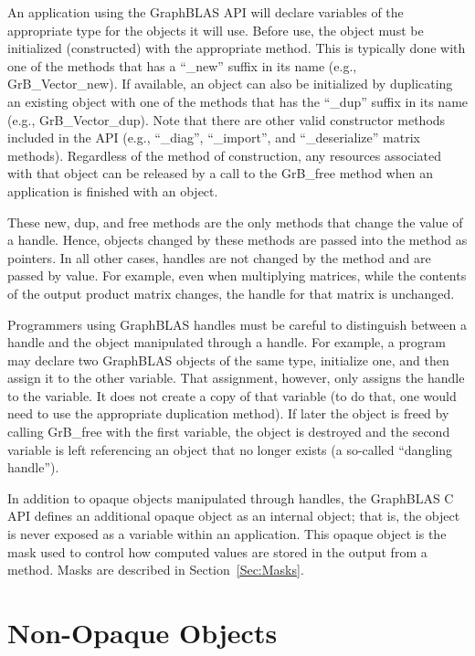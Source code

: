 An application using the GraphBLAS API will declare variables of the appropriate
type for the objects it will use.  Before use, the object must be initialized (constructed) with 
the appropriate method.  This is typically done with one of the methods that has a ``{\sf \_new}'' suffix in its 
name (e.g., {\sf GrB\_Vector\_new}).  If available, an object can also be initialized by duplicating
an existing object with one of the methods that has the ``{\sf \_dup}'' suffix in its 
name  (e.g., {\sf GrB\_Vector\_dup}).  Note that there are other valid constructor methods included in 
the API (e.g., ``{\sf \_diag}'', ``{\sf \_import}'', and ``{\sf \_deserialize}'' matrix methods).
Regardless of the method of construction, any resources associated with that object can be released by a
call to the {\sf GrB\_free} method when an application is finished with 
an object.    

These {\sf new}, {\sf dup}, and {\sf free} methods are the only methods that 
change the value of a handle.  Hence, objects changed by these methods are passed
into the method as pointers.  In all other cases, handles are not changed by the 
method and are passed by value.  For example, even when multiplying matrices, 
while the contents of the output product matrix changes, the handle for that matrix is unchanged. 

Programmers using GraphBLAS handles must be careful to distinguish between a handle and the 
object manipulated through a handle.  For example, a program may declare two 
GraphBLAS objects of the same type, initialize one, and then assign it to the other
variable.  That assignment, however, only assigns the handle to the variable.  It does not 
create a copy of that variable (to do that, one would need to use the appropriate duplication method).
If later the object is freed by calling {\sf GrB\_free} with the first variable, the object
is destroyed and the second variable is left referencing an object that no longer 
exists (a so-called ``dangling handle'').

In addition to opaque objects manipulated through handles, the GraphBLAS C API defines
an additional opaque object as an internal object; that is, the object is never exposed as
a variable within an application.  This opaque object is the mask used to
control how computed values are stored in the output from a method.  Masks 
are described in Section~\ref{Sec:Masks}.

\section{Non-Opaque Objects}

